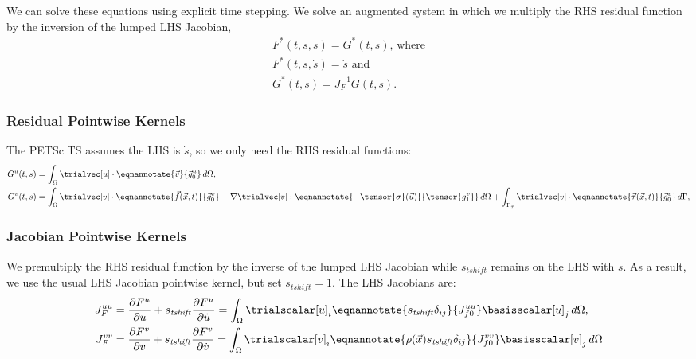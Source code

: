 We can solve these equations using explicit time stepping. We solve an
augmented system in which we multiply the RHS residual function by the
inversion of the lumped LHS Jacobian,
\begin{gather}
  F^*(t,s,\dot{s}) = G^*(t,s) \text{, where} \\
  F^*(t,s,\dot{s}) = \dot{s} \text{ and} \\
  G^*(t,s) = J_F^{-1} G(t,s).
\end{gather}


\subsubsection{Residual Pointwise Kernels}

The PETSc TS assumes the LHS is $\dot{s}$, so we only need the RHS residual functions:
\begin{align}
  G^u(t,s) &= \int_\Omega \trialvec[u] \cdot \eqnannotate{\vec{v}}{\vec{g}^u_0} \, d\Omega, \\
  G^v(t,s) &=  \int_\Omega \trialvec[v] \cdot \eqnannotate{\vec{f}(\vec{x},t)}{\vec{g}^v_0} + \nabla \trialvec[v] : \eqnannotate{-\tensor{\sigma}(\vec{u})}{\tensor{g^v_1}} \, d\Omega
  + \int_{\Gamma_\tau} \trialvec[v] \cdot \eqnannotate{\vec{\tau}(\vec{x},t)}{\vec{g}^v_0} \, d\Gamma,
\end{align}

\subsubsection{Jacobian Pointwise Kernels}

We premultiply the RHS residual function by the inverse of the lumped
LHS Jacobian while $s_\mathit{tshift}$ remains on the LHS with
$\dot{s}$. As a result, we use the usual LHS Jacobian pointwise
kernel, but set $s_\mathit{tshift}=1$.  The LHS Jacobians are:
\begin{align}
  J_F^{uu} &= \frac{\partial F^u}{\partial u} + s_\mathit{tshift} \frac{\partial F^u}{\partial \dot{u}} =
             \int_\Omega \trialscalar[u]_i \eqnannotate{s_\mathit{tshift} \delta_{ij}}{J^{uu}_{f0}} \basisscalar[u]_j  \, d\Omega, \\
  J_F^{vv} &= \frac{\partial F^v}{\partial v} + s_\mathit{tshift} \frac{\partial F^v}{\partial \dot{v}} =
             \int_\Omega \trialscalar[v]_i \eqnannotate{\rho(\vec{x}) s_\mathit{tshift} \delta_{ij}}{J ^{vv}_{f0}} \basisscalar[v]_j \, d\Omega
\end{align}


